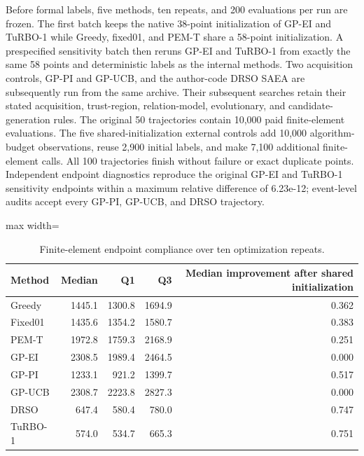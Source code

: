 \documentclass[cmc,article,submit,moreauthors,pdftex]{Definitions/tsp}
\begin{document}
Before formal labels, five methods, ten repeats, and 200 evaluations per run are frozen. The first batch keeps the native 38-point initialization of GP-EI and TuRBO-1 while Greedy, fixed01, and PEM-T share a 58-point initialization. A prespecified sensitivity batch then reruns GP-EI and TuRBO-1 from exactly the same 58 points and deterministic labels as the internal methods. Two acquisition controls, GP-PI and GP-UCB, and the author-code DRSO SAEA are subsequently run from the same archive. Their subsequent searches retain their stated acquisition, trust-region, relation-model, evolutionary, and candidate-generation rules. The original 50 trajectories contain 10,000 paid finite-element evaluations. The five shared-initialization external controls add 10,000 algorithm-budget observations, reuse 2,900 initial labels, and make 7,100 additional finite-element calls. All 100 trajectories finish without failure or exact duplicate points. Independent endpoint diagnostics reproduce the original GP-EI and TuRBO-1 sensitivity endpoints within a maximum relative difference of 6.23e-12; event-level audits accept every GP-PI, GP-UCB, and DRSO trajectory.

\begin{table}[H]
\tablesize{\scriptsize}
\caption{Finite-element endpoint compliance over ten optimization repeats.}
\label{tab:main-4}
\centering
\begin{adjustbox}{max width=\textwidth}
\begin{tabular}{lrrrr}
\toprule
\textbf{Method} & \textbf{Median} & \textbf{Q1} & \textbf{Q3} & \textbf{Median improvement after shared initialization} \\
\midrule
Greedy & 1445.1 & 1300.8 & 1694.9 & 0.362 \\
Fixed01 & 1435.6 & 1354.2 & 1580.7 & 0.383 \\
PEM-T & 1972.8 & 1759.3 & 2168.9 & 0.251 \\
GP-EI & 2308.5 & 1989.4 & 2464.5 & 0.000 \\
GP-PI & 1233.1 & 921.2 & 1399.7 & 0.517 \\
GP-UCB & 2308.7 & 2223.8 & 2827.3 & 0.000 \\
DRSO & 647.4 & 580.4 & 780.0 & 0.747 \\
TuRBO-1 & 574.0 & 534.7 & 665.3 & 0.751 \\
\bottomrule
\end{tabular}
\end{adjustbox}
\end{table}
\end{document}
